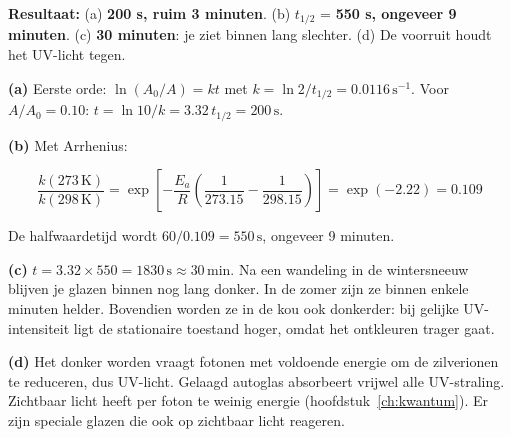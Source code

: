 \begin{oplossing}
\textbf{Resultaat:} (a) \textbf{200 s, ruim 3 minuten}. (b) \(t_{1/2}\) = \textbf{550 s, ongeveer 9 minuten}. (c) \textbf{30 minuten}: je ziet binnen lang slechter. (d) De voorruit houdt het UV-licht tegen.

\textbf{(a)} Eerste orde: \(\ln(A_0/A) = kt\) met \(k = \ln 2/t_{1/2} = 0.0116\,\mathrm{s^{-1}}\). Voor \(A/A_0 = 0.10\): \(t = \ln 10/k = 3.32\,t_{1/2} = 200\,\mathrm{s}\).

\textbf{(b)} Met Arrhenius:

\[
\frac{k(273\,\mathrm{K})}{k(298\,\mathrm{K})} = \exp\left[-\frac{E_a}{R}\left(\frac{1}{273.15}-\frac{1}{298.15}\right)\right] = \exp(-2.22) = 0.109
\]

De halfwaardetijd wordt \(60/0.109 = 550\,\mathrm{s}\), ongeveer 9 minuten.

\textbf{(c)} \(t = 3.32 \times 550 = 1830\,\mathrm{s} \approx 30\,\mathrm{min}\). Na een wandeling in de wintersneeuw blijven je glazen binnen nog lang donker. In de zomer zijn ze binnen enkele minuten helder. Bovendien worden ze in de kou ook donkerder: bij gelijke UV-intensiteit ligt de stationaire toestand hoger, omdat het ontkleuren trager gaat.

\textbf{(d)} Het donker worden vraagt fotonen met voldoende energie om de zilverionen te reduceren, dus UV-licht. Gelaagd autoglas absorbeert vrijwel alle UV-straling. Zichtbaar licht heeft per foton te weinig energie (hoofdstuk~\ref{ch:kwantum}). Er zijn speciale glazen die ook op zichtbaar licht reageren.
\end{oplossing}

